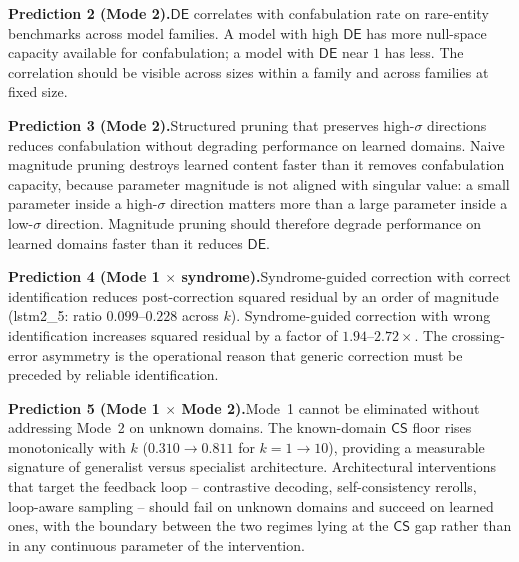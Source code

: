 \documentclass[11pt,a4paper]{article}
\newcommand{\CS}{\mathsf{CS}}
\newcommand{\DE}{\mathsf{DE}}
\begin{document}
\begin{mdframed}[backgroundcolor=mode2bg, linecolor=mode2col, linewidth=1pt]
\textbf{Prediction 2 (Mode 2).}\quad $\DE$ correlates with confabulation rate on rare-entity benchmarks across model families. A model with high $\DE$ has more null-space capacity available for confabulation; a model with $\DE$ near $1$ has less. The correlation should be visible across sizes within a family and across families at fixed size.
\end{mdframed}

\begin{mdframed}[backgroundcolor=mode2bg, linecolor=mode2col, linewidth=1pt]
\textbf{Prediction 3 (Mode 2).}\quad Structured pruning that preserves high-$\sigma$ directions reduces confabulation without degrading performance on learned domains. Naive magnitude pruning destroys learned content faster than it removes confabulation capacity, because parameter magnitude is not aligned with singular value: a small parameter inside a high-$\sigma$ direction matters more than a large parameter inside a low-$\sigma$ direction. Magnitude pruning should therefore degrade performance on learned domains faster than it reduces $\DE$.
\end{mdframed}

\begin{mdframed}[backgroundcolor=mode1bg, linecolor=mode1col, linewidth=1pt]
\textbf{Prediction 4 (Mode 1 $\times$ syndrome).}\quad Syndrome-guided correction with correct identification reduces post-correction squared residual by an order of magnitude (lstm2\_5: ratio $0.099$--$0.228$ across $k$). Syndrome-guided correction with wrong identification increases squared residual by a factor of $1.94$--$2.72\times$. The crossing-error asymmetry is the operational reason that generic correction must be preceded by reliable identification.
\end{mdframed}

\begin{mdframed}[backgroundcolor=insightbg, linecolor=insightcol, linewidth=1pt]
\textbf{Prediction 5 (Mode 1 $\times$ Mode 2).}\quad Mode~1 cannot be eliminated without addressing Mode~2 on unknown domains. The known-domain $\CS$ floor rises monotonically with $k$ ($0.310 \to 0.811$ for $k = 1
\to 10$), providing a measurable signature of generalist versus specialist architecture. Architectural interventions that target the feedback loop -- contrastive decoding, self-consistency rerolls, loop-aware sampling -- should fail on unknown domains and succeed on learned ones, with the boundary between the two regimes lying at the $\CS$ gap rather than in any continuous parameter of the intervention.
\end{mdframed}
\end{document}
